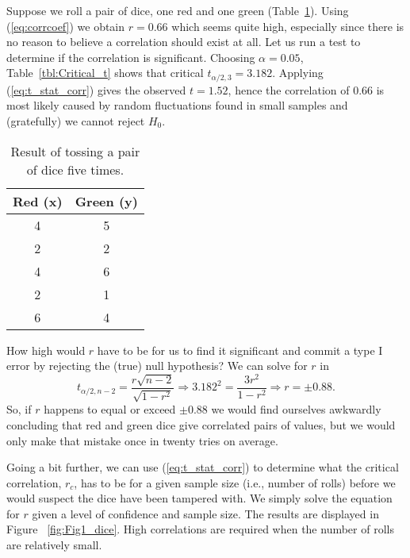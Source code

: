 \begin{example}
Suppose we roll a pair of dice, one red and one green 
(Table~\ref{tbl:dice1}).  Using (\ref{eq:corrcoef}) we obtain $r = 0.66$ which seems quite high, especially since there is no 
reason to believe a correlation should exist at all.  Let us run a test to determine if the correlation is 
significant.  Choosing $\alpha = 0.05$, Table~\ref{tbl:Critical_t} shows that critical $t_{\alpha/2,3} = 3.182$.  Applying
(\ref{eq:t_stat_corr}) gives the observed 
$t = 1.52$, hence the correlation of 0.66 is most likely caused by random fluctuations found in small 
samples and (gratefully) we cannot reject $H_0$.
\begin{table}[h]
\centering
\begin{tabular}{|c|c|} \hline
\bf{Red} (x) & \bf{Green} (y) \\ \hline
4 & 5 \\ \hline
2 & 2 \\ \hline
4 & 6 \\ \hline
2 & 1 \\ \hline
6 & 4 \\ \hline
\end{tabular}
\caption{Result of tossing a pair of dice five times.}
\label{tbl:dice1}
\end{table}

 	How high would $r$ have to be for us to find it significant and commit a type I error by 
rejecting the (true) null hypothesis?  We can solve for $r$ in
\begin{equation}
t_{\alpha/2,n-2} = \frac{r \sqrt{n-2}}{\sqrt{1 - r^2}} \Rightarrow  3.182^2 = \frac{3r^2}{1-r^2} \Rightarrow r =  \pm 0.88.
\end{equation}
So, if $r$ happens to equal or exceed $\pm 0.88$ we would find ourselves awkwardly concluding that red and green dice give 
correlated pairs of values, but we would only make that mistake once in twenty tries on average.
\end{example}
Going a bit further, we can use (\ref{eq:t_stat_corr}) to determine what the critical correlation, $r_c$, has to be
for a given sample size (i.e., number of rolls) before we would suspect the dice have been tampered with.  We
simply solve the equation for $r$ given a level of confidence and sample size.  The results are displayed in
Figure ~\ref{fig:Fig1_dice}.  High correlations are required when the number of rolls are relatively small.

